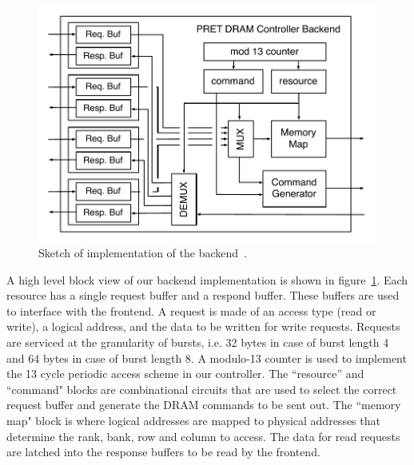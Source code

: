 \begin{figure}
\begin{center}
\vspace{-8mm}
\includegraphics[width=1.1\linewidth]{figs/dram-backend-implementation}
\end{center}
\caption{Sketch of implementation of the backend~\cite{ReinekeLiuPatelKimLee11_PRETDRAMControllerBankPrivatizationForPredictability}.}
\label{fig:dram-backend-implementation}
\end{figure}

A high level block view of our backend implementation is shown in figure~\ref{fig:dram-backend-implementation}.
Each resource has a single request buffer and a respond buffer.
These buffers are used to interface with the frontend.   
A request is made of an access type (read or write), a logical address, and the data to be written for write requests. 
Requests are serviced at the granularity of bursts, i.e. 32 bytes in case of burst length 4 and 64 bytes in case of burst length 8.
A modulo-13 counter is used to implement the 13 cycle periodic access scheme in our controller.   
The ``resource'' and ``command" blocks are combinational circuits that are used to select the correct request buffer and generate the DRAM commands to be sent out. 
The ``memory map" block is where logical addresses are mapped to physical addresses that determine the rank, bank, row and column to access.
The data for read requests are latched into the response buffers to be read by the frontend.  

